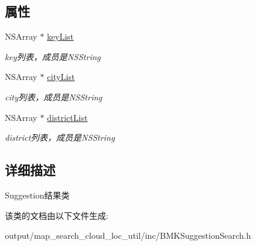 \subsection*{属性}
\begin{DoxyCompactItemize}
\item 
\hypertarget{interface_b_m_k_suggestion_result_a799c815afa6706915ba59cb1b917696f}{N\+S\+Array $\ast$ \hyperlink{interface_b_m_k_suggestion_result_a799c815afa6706915ba59cb1b917696f}{key\+List}}\label{interface_b_m_k_suggestion_result_a799c815afa6706915ba59cb1b917696f}

\begin{DoxyCompactList}\small\item\em key列表，成员是\+N\+S\+String \end{DoxyCompactList}\item 
\hypertarget{interface_b_m_k_suggestion_result_a84e062c301ca7d07ebd586cbbb995c8c}{N\+S\+Array $\ast$ \hyperlink{interface_b_m_k_suggestion_result_a84e062c301ca7d07ebd586cbbb995c8c}{city\+List}}\label{interface_b_m_k_suggestion_result_a84e062c301ca7d07ebd586cbbb995c8c}

\begin{DoxyCompactList}\small\item\em city列表，成员是\+N\+S\+String \end{DoxyCompactList}\item 
\hypertarget{interface_b_m_k_suggestion_result_ac60b5de3361f806d6bc4266a5c450d42}{N\+S\+Array $\ast$ \hyperlink{interface_b_m_k_suggestion_result_ac60b5de3361f806d6bc4266a5c450d42}{district\+List}}\label{interface_b_m_k_suggestion_result_ac60b5de3361f806d6bc4266a5c450d42}

\begin{DoxyCompactList}\small\item\em district列表，成员是\+N\+S\+String \end{DoxyCompactList}\end{DoxyCompactItemize}


\subsection{详细描述}
Suggestion结果类 

该类的文档由以下文件生成\+:\begin{DoxyCompactItemize}
\item 
output/map\+\_\+search\+\_\+cloud\+\_\+loc\+\_\+util/inc/B\+M\+K\+Suggestion\+Search.\+h\end{DoxyCompactItemize}
